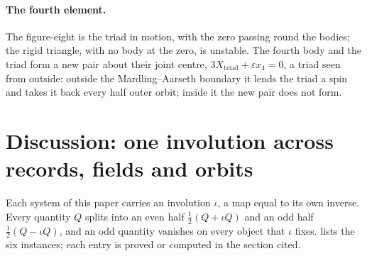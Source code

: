 \documentclass[11pt]{article}
\theoremstyle{definition}\newtheorem{definition}[theorem]{Definition}
\theoremstyle{remark}\newtheorem{remark}[theorem]{Remark}
\begin{document}
\paragraph{The fourth element.} The figure-eight is the triad in motion, with the zero passing round the bodies; the rigid triangle, with no body at the zero, is unstable. The fourth body and the triad form a new pair about their joint centre, $3X_{\mathrm{triad}}+\varepsilon x_4=0$, a triad seen from outside: outside the Mardling--Aarseth boundary it lends the triad a spin and takes it back every half outer orbit; inside it the new pair does not form.

\section{Discussion: one involution across records, fields and orbits}\label{sec:one}
Each system of this paper carries an involution $\iota$, a map equal to its own inverse. Every quantity $Q$ splits into an even half $\frac12(Q+\iota Q)$ and an odd half $\frac12(Q-\iota Q)$, and an odd quantity vanishes on every object that $\iota$ fixes.  lists the six instances; each entry is proved or computed in the section cited.
\end{document}
